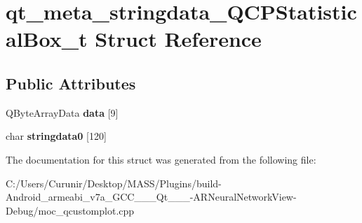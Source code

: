 \hypertarget{structqt__meta__stringdata___q_c_p_statistical_box__t}{}\section{qt\+\_\+meta\+\_\+stringdata\+\_\+\+Q\+C\+P\+Statistical\+Box\+\_\+t Struct Reference}
\label{structqt__meta__stringdata___q_c_p_statistical_box__t}
\subsection*{Public Attributes}
\begin{DoxyCompactItemize}
\item 
\mbox{\label{structqt__meta__stringdata___q_c_p_statistical_box__t_aa146260f94081fca36b257bf40501fdf}} 
Q\+Byte\+Array\+Data {\bfseries data} \mbox{[}9\mbox{]}
\item 
\mbox{\label{structqt__meta__stringdata___q_c_p_statistical_box__t_a7224c9e5e47be18f7fa0cd99a3d0a2ce}} 
char {\bfseries stringdata0} \mbox{[}120\mbox{]}
\end{DoxyCompactItemize}


The documentation for this struct was generated from the following file\+:\begin{DoxyCompactItemize}
\item 
C\+:/\+Users/\+Curunir/\+Desktop/\+M\+A\+S\+S/\+Plugins/build-\/\+Android\+\_\+armeabi\+\_\+v7a\+\_\+\+G\+C\+C\+\_\+\_\+\_\+\+Qt\+\_\+\_\+\_-\/\+A\+R\+Neural\+Network\+View-\/\+Debug/moc\+\_\+qcustomplot.\+cpp\end{DoxyCompactItemize}
